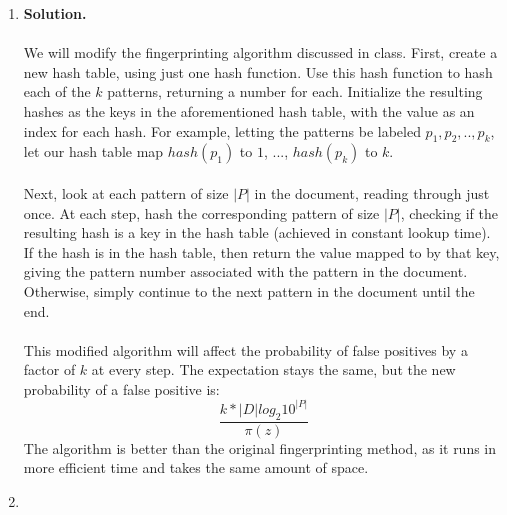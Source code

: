 \documentclass[11pt]{article}
\newcommand\solution{%
  \textbf{Solution.}\\%
}
\begin{document}
\begin{enumerate}
\item 

\solution \\
We will modify the fingerprinting algorithm discussed in class. First, create a new hash table, using just one hash function. Use this hash function to hash each of the $k$ patterns, returning a number for each. Initialize the resulting hashes as the keys in the aforementioned hash table, with the value as an index for each hash. For example, letting the patterns be labeled $p_1, p_2, .., p_k$, let our hash table map $hash(p_1)$ to $1$, ...,  $hash(p_k)$ to $k$. \\
\\
Next, look at each pattern of size $|P|$ in the document, reading through just once. At each step, hash the corresponding pattern of size $|P|$, checking if the resulting hash is a key in the hash table (achieved in constant lookup time). If the hash is in the hash table, then return the value mapped to by that key, giving the pattern number associated with the pattern in the document. Otherwise, simply continue to the next pattern in the document until the end. \\
\\
This modified algorithm will affect the probability of false positives by a factor of $k$ at every step. The expectation stays the same, but the new probability of a false positive is:
\begin{equation*}
  \frac{k*|D| log_2 10^{|P|}}{\pi(z)}
\end{equation*}
The algorithm is better than the original fingerprinting method, as it runs in more efficient time and takes the same amount of space. 

\item 


\end{enumerate}
\end{document}
